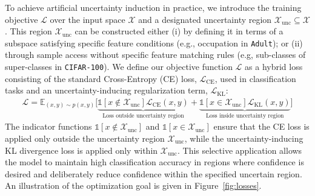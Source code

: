 To achieve artificial uncertainty induction in practice, we introduce the \attack training objective \(\mathcal{L}\) over the input space \(\mathcal{X}\) and a designated uncertainty region \(\mathcal{X}_\text{unc} \subseteq \mathcal{X}\). This region $\mathcal{X}_\text{unc}$ can be constructed either (i) by defining it in terms of a subspace satisfying specific feature conditions (e.g., occupation in \texttt{Adult}); or (ii) through sample access without specific feature matching rules (e.g, sub-classes of super-classes in \texttt{CIFAR-100}). We define our objective function \(\mathcal{L}\) as a hybrid loss consisting of the standard Cross-Entropy (CE) loss, \(\mathcal{L}_\text{CE}\), used in classification tasks and an uncertainty-inducing regularization term, \(\mathcal{L}_\text{KL}\):
\begin{equation}
\label{eq:mirage}
    \begin{split}
        \mathcal{L} = \mathbb{E}_{(x,y) \sim p(x, y)} \bigg[ \underbrace{\mathds{1}\left[x \not\in \mathcal{X}_\text{unc}\right] \mathcal{L}_\text{CE}(x, y)}_\text{Loss outside uncertainty region} + 
        \underbrace{\mathds{1}\left[x \in \mathcal{X}_\text{unc}\right] \mathcal{L}_\text{KL}(x, y)}_\text{Loss inside uncertainty region} \bigg]
    \end{split}
\end{equation}
The indicator functions \(\mathds{1}\left[x \not\in \mathcal{X}_\text{unc}\right]\) and \(\mathds{1}\left[x \in \mathcal{X}_\text{unc}\right]\) ensure that the CE loss is applied only outside the uncertainty region \(\mathcal{X}_\text{unc}\), while the uncertainty-inducing KL divergence loss is applied only within \(\mathcal{X}_\text{unc}\). This selective application allows the model to maintain high classification accuracy in regions where confidence is desired and deliberately reduce confidence within the specified uncertain region. An illustration of the optimization goal is given in Figure~\ref{fig:losses}.

